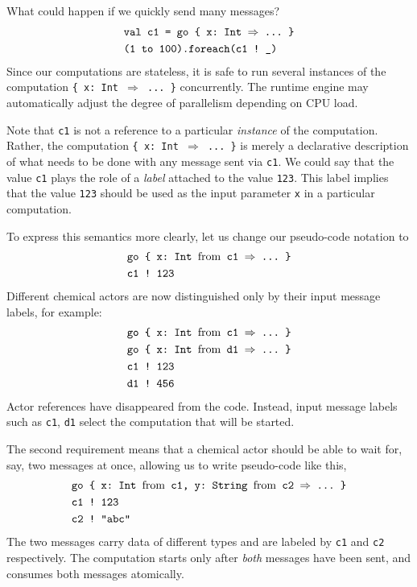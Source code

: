 \documentclass[sigplan,10pt]{acmart}\settopmatter{}
\begin{document}
What could happen if we quickly send many messages? 
\begin{align*}
\text{} & \texttt{val c1 }\text{\texttt{= go \{ x:~Int \ensuremath{\Rightarrow} ...~\}}}\\
 & \text{\texttt{(1 to 100).foreach(c1 !~\_) }}
\end{align*}
Since our computations are stateless, it is safe to run several instances
of the computation \texttt{\{ x: Int $\Rightarrow$ ...~\}} concurrently.
The runtime engine may automatically adjust the degree of parallelism
depending on CPU load.

Note that \texttt{c1} is not a reference to a particular \emph{instance}
of the computation. Rather, the computation \texttt{\{ x: Int $\Rightarrow$
...~\}} is merely a declarative description of what needs to be done
with any message sent via \texttt{c1}. We could say that the value
\texttt{c1} plays the role of a \emph{label} attached to the value
\texttt{123}. This label implies that the value \texttt{123} should
be used as the input parameter \texttt{x} in a particular computation. 

To express this semantics more clearly, let us change our pseudo-code
notation to 
\begin{align*}
\text{} & \text{\texttt{go \{ x:~Int \textnormal{from} c1 \ensuremath{\Rightarrow} ...~\}}}\\
 & \text{\texttt{c1 !~123 }}
\end{align*}
Different chemical actors are now distinguished only by their input
message labels, for example:
\begin{align*}
\text{} & \text{\texttt{go \{ x:~Int \textnormal{from} c1 \ensuremath{\Rightarrow} ...~\}}}\\
\text{} & \text{\texttt{go \{ x:~Int \textnormal{from} d1 \ensuremath{\Rightarrow} ...~\}}}\\
 & \text{\texttt{c1 !~123 }}\\
 & \text{\texttt{d1 !~456 }}
\end{align*}
Actor references have disappeared from the code. Instead, input message
labels such as \texttt{c1}, \texttt{d1} select the computation that
will be started.

The second requirement means that a chemical actor should be able
to wait for, say, two messages at once, allowing us to write pseudo-code
like this, 
\begin{align*}
\text{} & \text{\texttt{go \{ x:~Int \textnormal{from} c1, y:~String \textnormal{from} c2 \ensuremath{\Rightarrow} ...~\}}}\\
 & \text{\texttt{c1 !~123}}\\
 & \text{\texttt{c2 !~"abc"}}
\end{align*}
The two messages carry data of different types and are labeled by
\texttt{c1} and \texttt{c2} respectively. The computation starts only
after \emph{both} messages have been sent, and consumes both messages
atomically.
\end{document}
